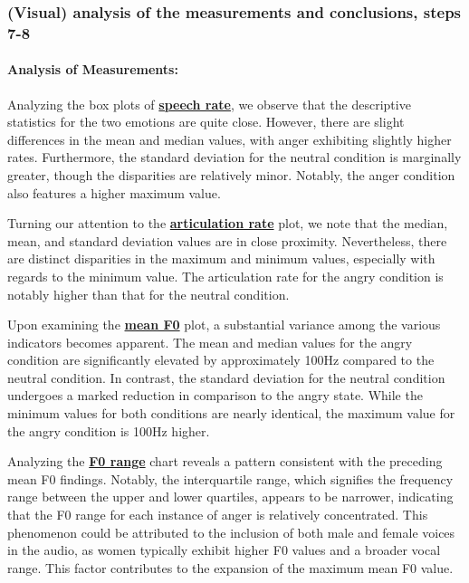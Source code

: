 \documentclass{../labbook}
\begin{document}
\begin{solution}
\subsubsection{(Visual) analysis of the measurements and conclusions, steps 7-8}

\paragraph{Analysis of Measurements:\\} 

Analyzing the box plots of \underline{\textbf{speech rate}}, we observe that the descriptive statistics for the two emotions are quite close. However, there are slight differences in the mean and median values, with anger exhibiting slightly higher rates. Furthermore, the standard deviation for the neutral condition is marginally greater, though the disparities are relatively minor. Notably, the anger condition also features a higher maximum value.

Turning our attention to the \underline{\textbf{articulation rate}} plot, we note that the median, mean, and standard deviation values are in close proximity. Nevertheless, there are distinct disparities in the maximum and minimum values, especially with regards to the minimum value. The articulation rate for the angry condition is notably higher than that for the neutral condition.

Upon examining the \underline{\textbf{mean F0}} plot, a substantial variance among the various indicators becomes apparent. The mean and median values for the angry condition are significantly elevated by approximately 100Hz compared to the neutral condition. In contrast, the standard deviation for the neutral condition undergoes a marked reduction in comparison to the angry state. While the minimum values for both conditions are nearly identical, the maximum value for the angry condition is 100Hz higher.

Analyzing the \underline{\textbf{F0 range}} chart reveals a pattern consistent with the preceding mean F0 findings. Notably, the interquartile range, which signifies the frequency range between the upper and lower quartiles, appears to be narrower, indicating that the F0 range for each instance of anger is relatively concentrated. This phenomenon could be attributed to the inclusion of both male and female voices in the audio, as women typically exhibit higher F0 values and a broader vocal range. This factor contributes to the expansion of the maximum mean F0 value.


\end{solution}
\end{document}
